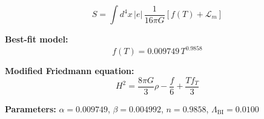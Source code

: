 
\begin{equation}
  S = \int d^4x \, |e| \, \frac{1}{16\pi G} \left[ f(T) + \mathcal{L}_m \right]
\end{equation}

\textbf{Best-fit model:}
\begin{equation}
  f(T) = 0.009749 \, T^{0.9858}
\end{equation}

\textbf{Modified Friedmann equation:}
\begin{equation}
  H^2 = \frac{8\pi G}{3} \rho - \frac{f}{6} + \frac{T f_T}{3}
\end{equation}

\textbf{Parameters:}
$\alpha = 0.009749$, \quad
$\beta = 0.004992$, \quad
$n = 0.9858$, \quad
$\Lambda_{\text{BI}} = 0.0100$
